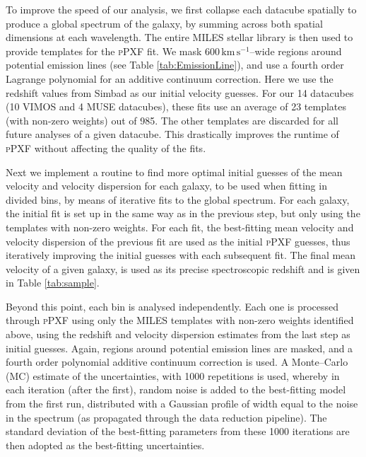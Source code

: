 		To improve the speed of our analysis, we first collapse each datacube spatially to produce a global spectrum of the galaxy, by summing across both spatial dimensions at each wavelength. The entire MILES stellar library \citep{Sanchez-Blazquez2006, Falcon-Barroso2011a} is then used to provide templates for the \textsc{pPXF} fit. We mask $600\,\mathrm{km\,s^{-1}}$--wide regions around potential emission lines (see Table \ref{tab:EmissionLine}), and use a fourth order Lagrange polynomial for an additive continuum correction. Here we use the redshift values from Simbad \citep{Wenger2000} as our initial velocity guesses. For our 14 datacubes (10 VIMOS and 4 MUSE datacubes), these fits use an average of 23 templates (with non-zero weights) out of 985. The other templates are discarded for all future analyses of a given datacube. This drastically improves the runtime of \textsc{pPXF} without affecting the quality of the fits.

		Next we implement a routine to find more optimal initial guesses of the mean velocity and velocity dispersion for each galaxy, to be used when fitting in divided bins, by means of iterative fits to the global spectrum. For each galaxy, the initial fit is set up in the same way as in the previous step, but only using the templates with non-zero weights. For each fit, the best-fitting mean velocity and velocity dispersion of the previous fit are used as the initial \textsc{pPXF} guesses, thus iteratively improving the initial guesses with each subsequent fit. The final mean velocity of a given galaxy, is used as its precise spectroscopic redshift and is given in Table \ref{tab:sample}. 


		Beyond this point, each bin is analysed independently. Each one is processed through \textsc{pPXF} using only the MILES templates with non-zero weights identified above, using the redshift and velocity dispersion estimates from the last step as initial guesses. Again, regions around potential emission lines are masked, and a fourth order polynomial additive continuum correction is used. A Monte--Carlo (MC) estimate of the uncertainties, with 1000 repetitions is used, whereby in each iteration (after the first), random noise is added to the best-fitting model from the first run, distributed with a Gaussian profile of width equal to the noise in the spectrum (as propagated through the data reduction pipeline). The standard deviation of the best-fitting parameters from these 1000 iterations are then adopted as the best-fitting uncertainties.

